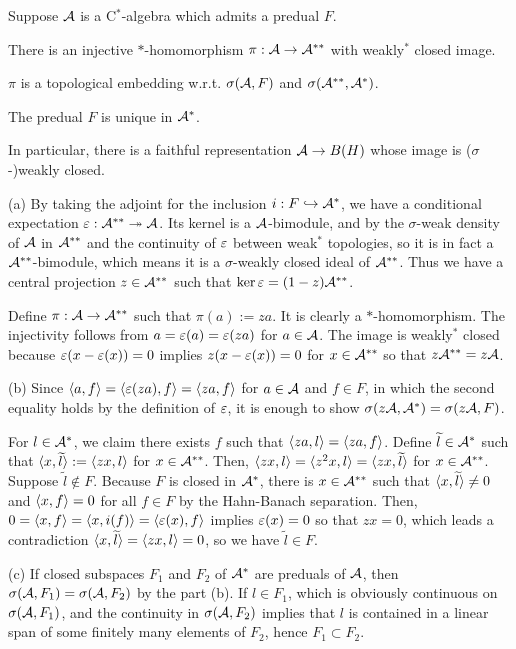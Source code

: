 \documentclass{../../../small}
\begin{document}
\begin{thm}[Sakai]
Suppose $\mathcal{A}$ is a C$^*$-algebra which admits a predual $F$.
\begin{parts}
\item There is an injective $*$-homomorphism $\pi:\mathcal{A}\to\mathcal{A}^{**}$ with weakly$^*$ closed image.
\item $\pi$ is a topological embedding w.r.t. $\sigma(\mathcal{A},F)$ and $\sigma(\mathcal{A}^{**},\mathcal{A}^*)$.
\item The predual $F$ is unique in $\mathcal{A}^*$.
\end{parts}
In particular, there is a faithful representation $\mathcal{A}\to B(H)$ whose image is ($\sigma$-)weakly closed.
\end{thm}
\begin{pf}
(a)
By taking the adjoint for the inclusion $i:F\hookrightarrow\mathcal{A}^*$, we have a conditional expectation $\varepsilon:\mathcal{A}^{**}\twoheadrightarrow\mathcal{A}$.
Its kernel is a $\mathcal{A}$-bimodule, and by the $\sigma$-weak density of $\mathcal{A}$ in $\mathcal{A}^{**}$ and the continuity of $\varepsilon$ between weak$^*$ topologies, so it is in fact a $\mathcal{A}^{**}$-bimodule, which means it is a $\sigma$-weakly closed ideal of $\mathcal{A}^{**}$.
Thus we have a central projection $z\in\mathcal{A}^{**}$ such that $\ker\varepsilon=(1-z)\mathcal{A}^{**}$.

Define $\pi:\mathcal{A}\to\mathcal{A}^{**}$ such that $\pi(a):=za$.
It is clearly a $*$-homomorphism.
The injectivity follows from $a=\varepsilon(a)=\varepsilon(za)$ for $a\in\mathcal{A}$.
The image is weakly$^*$ closed because $\varepsilon(x-\varepsilon(x))=0$ implies $z(x-\varepsilon(x))=0$ for $x\in\mathcal{A}^{**}$ so that $z\mathcal{A}^{**}=z\mathcal{A}$.

(b)
Since $\langle a,f\rangle=\langle\varepsilon(za),f\rangle=\langle za,f\rangle$ for $a\in\mathcal{A}$ and $f\in F$, in which the second equality holds by the definition of $\varepsilon$, it is enough to show $\sigma(z\mathcal{A},\mathcal{A}^*)=\sigma(z\mathcal{A},F)$.

For $l\in\mathcal{A}^*$, we claim there exists $f$ such that $\langle za,l\rangle=\langle za,f\rangle$.
Define $\widetilde l\in\mathcal{A}^*$ such that $\langle x,\widetilde l\rangle:=\langle zx,l\rangle$ for $x\in\mathcal{A}^{**}$.
Then, $\langle zx,l\rangle=\langle z^2x,l\rangle=\langle zx,\widetilde l\rangle$ for $x\in\mathcal{A}^{**}$.
Suppose $\tilde l\notin F$.
Because $F$ is closed in $\mathcal{A}^*$, there is $x\in\mathcal{A}^{**}$ such that $\langle x,\widetilde l\rangle\ne0$ and $\langle x,f\rangle=0$ for all $f\in F$ by the Hahn-Banach separation.
Then, $0=\langle x,f\rangle=\langle x,i(f)\rangle=\langle\varepsilon(x),f\rangle$ implies $\varepsilon(x)=0$ so that $zx=0$, which leads a contradiction $\langle x,\widetilde l\rangle=\langle zx,l\rangle=0$, so we have $\tilde l\in F$.

(c)
If closed subspaces $F_1$ and $F_2$ of $\mathcal{A}^*$ are preduals of $\mathcal{A}$, then $\sigma(\mathcal{A},F_1)=\sigma(\mathcal{A},F_2)$ by the part (b).
If $l\in F_1$, which is obviously continuous on $\sigma(\mathcal{A},F_1)$, and the continuity in $\sigma(\mathcal{A},F_2)$ implies that $l$ is contained in a linear span of some finitely many elements of $F_2$, hence $F_1\subset F_2$.
\end{pf}
\end{document}
